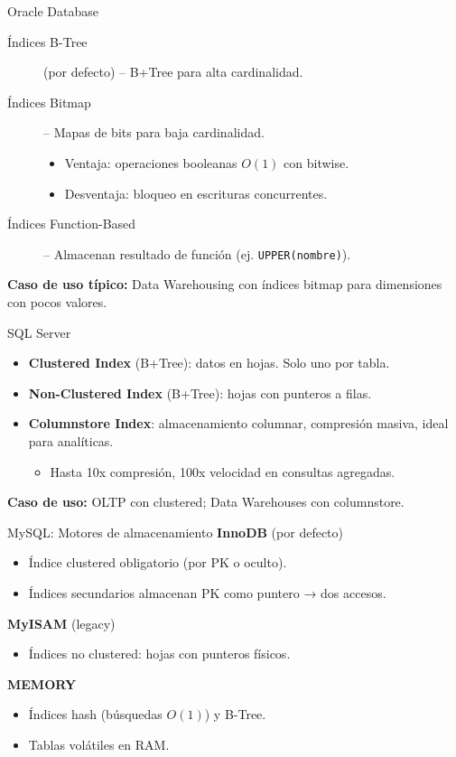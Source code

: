 \documentclass[aspectratio=169, 10pt, xcolor=table]{beamer}
\begin{document}
\begin{frame}{Oracle Database}
    \begin{description}
        \item[Índices B-Tree] (por defecto) – B+Tree para alta cardinalidad.
        \item[Índices Bitmap] – Mapas de bits para baja cardinalidad.
            \begin{itemize}
                \item Ventaja: operaciones booleanas $O(1)$ con bitwise.
                \item Desventaja: bloqueo en escrituras concurrentes.
            \end{itemize}
        \item[Índices Function-Based] – Almacenan resultado de función (ej. \texttt{UPPER(nombre)}).
    \end{description}
    \vspace{0.3cm}
    \textbf{Caso de uso típico:} Data Warehousing con índices bitmap para dimensiones con pocos valores.
\end{frame}

\begin{frame}{SQL Server}
    \begin{itemize}
        \item \textbf{Clustered Index} (B+Tree): datos en hojas. Solo uno por tabla.
        \item \textbf{Non-Clustered Index} (B+Tree): hojas con punteros a filas.
        \item \textbf{Columnstore Index}: almacenamiento columnar, compresión masiva, ideal para analíticas.
            \begin{itemize}
                \item Hasta 10x compresión, 100x velocidad en consultas agregadas.
            \end{itemize}
    \end{itemize}
    \vspace{0.3cm}
    \textbf{Caso de uso:} OLTP con clustered; Data Warehouses con columnstore.
\end{frame}

\begin{frame}{MySQL: Motores de almacenamiento}
    \textbf{InnoDB} (por defecto)
    \begin{itemize}
        \item Índice clustered obligatorio (por PK o oculto).
        \item Índices secundarios almacenan PK como puntero → dos accesos.
    \end{itemize}
    \textbf{MyISAM} (legacy)
    \begin{itemize}
        \item Índices no clustered: hojas con punteros físicos.
    \end{itemize}
    \textbf{MEMORY}
    \begin{itemize}
        \item Índices hash (búsquedas $O(1)$) y B-Tree.
        \item Tablas volátiles en RAM.
    \end{itemize}
\end{frame}
\end{document}
